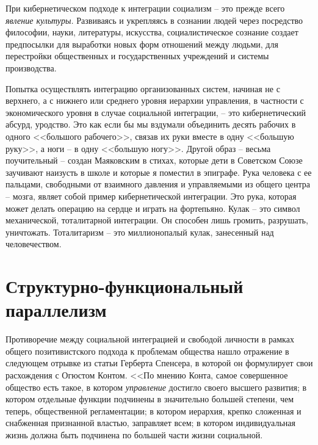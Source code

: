\documentclass{book}
\begin{document}
При кибернетическом подходе к интеграции социализм -- это прежде всего \textit{явление культуры.}  Развиваясь и укрепляясь в сознании людей через посредство философии, науки, литера­туры, искусства, социалистическое сознание создает предпосыл­ки для выработки новых форм отношений между людьми, для перестройки общественных и государственных учреждений и системы производства.

Попытка осуществлять интеграцию организованных систем, начиная не с верхнего, а с нижнего или среднего уровня иерар­хии управления, в частности с экономического уровня в случае социальной интеграции, -- это кибернетический абсурд, уродство. Это как если бы мы вздумали объединить десять ра­бочих в одного <<большого рабочего>>, связав их руки вместе в одну <<большую руку>>, а ноги -- в одну <<большую ногу>>. Другой образ -- весьма поучительный -- создан Маяковским в стихах, которые дети в Советском Союзе заучивают наизусть в школе и которые я поместил в эпиграфе. Рука человека с ее пальцами, свободными от взаимного давления и управляемыми из общего центра -- мозга, являет собой пример кибернетиче­ской интеграции. Это рука, которая может делать операцию на сердце и играть на фортепьяно. Кулак -- это символ механи­ческой, тоталитарной интеграции. Он способен лишь громить, разрушать, уничтожать. Тоталитаризм -- это миллионопалый кулак, занесенный над человечеством.


\section{Структурно-функциональный параллелизм}

Противоречие между социальной интеграцией и свободой личности в рамках общего позитивистского подхода к пробле­мам общества нашло отражение в следующем отрывке из статьи Герберта Спенсера, в которой он формулирует свои расхож­дения с Огюстом Контом.
<<По мнению Конта, самое совершенное общество есть такое, в котором \textit{управление}  достигло своего высшего развития; в котором отдельные функции подчинены в значительно большей степени, чем теперь, общественной регламентации; в котором иерархия, крепко сложенная и снабженная признанной властью, заправляет всем; в котором индивидуальная жизнь должна быть подчинена по большей части жизни социальной.
\end{document}
